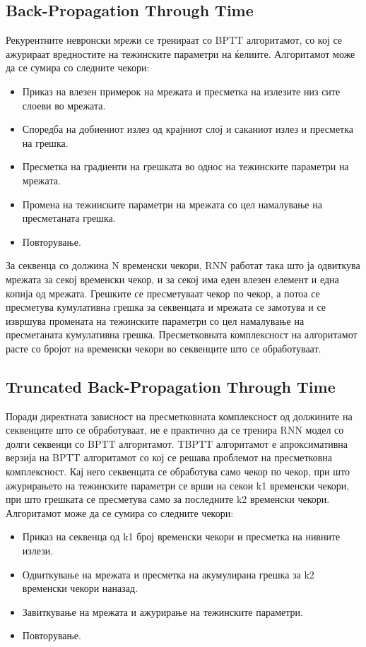 \subsection{Back-Propagation Through Time}
Рекурентните невронски мрежи се тренираат со BPTT алгоритамот, со кој се ажурираат вредностите на тежинските параметри на ќелиите. Алгоритамот може да се сумира со следните чекори:
\begin{itemize}
    \item Приказ на влезен примерок на мрежата и пресметка на излезите низ сите слоеви во мрежата.
    \item Споредба на добиениот излез од крајниот слој и саканиот излез и пресметка на грешка.
    \item Пресметка на градиенти на грешката во однос на тежинските параметри на мрежата.
    \item Промена на тежинските параметри на мрежата со цел намалување на пресметаната грешка.
    \item Повторување.
\end{itemize}

За секвенца со должина N временски чекори, RNN работат така што ја одвиткува мрежата за секој временски чекор, и за секој има еден влезен елемент и една копија од мрежата. Грешките се пресметуваат чекор по чекор, а потоа се пресметува кумулативна грешка за секвенцата и мрежата се замотува и се извршува промената на тежинските параметри со цел намалување на пресметаната кумулативна грешка. Пресметковната комплексност на алгоритамот расте со бројот на временски чекори во секвенците што се обработуваат. 

\subsection{Truncated Back-Propagation Through Time}

Поради директната зависност на пресметковната комплексност од должините на секвенците што се обработуваат, не е практично да се тренира RNN модел со долги секвенци со BPTT алгоритамот. TBPTT алгоритамот е апроксимативна верзија на BPTT алгоритамот со кој се решава проблемот на пресметковна комплексност. Кај него секвенцата се обработува само чекор по чекор, при што ажурирањето на тежинските параметри се врши на секои k1 временски чекори, при што грешката се пресметува само за последните k2 временски чекори. Алгоритамот може да се сумира со следните чекори:
\begin{itemize}
    \item Приказ на секвенца од k1 број временски чекори и пресметка на нивните излези.
    \item Одвиткување на мрежата и пресметка на акумулирана грешка за k2 временски чекори наназад.
    \item Завиткување на мрежата и ажурирање на тежинските параметри.
    \item Повторување.
\end{itemize}

